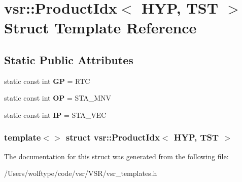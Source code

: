 \hypertarget{structvsr_1_1_product_idx_3_01_h_y_p_00_01_t_s_t_01_4}{\section{vsr\-:\-:Product\-Idx$<$ H\-Y\-P, T\-S\-T $>$ Struct Template Reference}
\label{structvsr_1_1_product_idx_3_01_h_y_p_00_01_t_s_t_01_4}
}
\subsection*{Static Public Attributes}
\begin{DoxyCompactItemize}
\item 
\hypertarget{structvsr_1_1_product_idx_3_01_h_y_p_00_01_t_s_t_01_4_a28641cdfaa7eb15dbb7767e15762afa7}{static const int {\bfseries G\-P} = R\-T\-C}\label{structvsr_1_1_product_idx_3_01_h_y_p_00_01_t_s_t_01_4_a28641cdfaa7eb15dbb7767e15762afa7}

\item 
\hypertarget{structvsr_1_1_product_idx_3_01_h_y_p_00_01_t_s_t_01_4_a94449d85c2a24c7a1dac92325568e8f6}{static const int {\bfseries O\-P} = S\-T\-A\-\_\-\-M\-N\-V}\label{structvsr_1_1_product_idx_3_01_h_y_p_00_01_t_s_t_01_4_a94449d85c2a24c7a1dac92325568e8f6}

\item 
\hypertarget{structvsr_1_1_product_idx_3_01_h_y_p_00_01_t_s_t_01_4_a3c419cc2c36a202a65904bc6fbaaf5d2}{static const int {\bfseries I\-P} = S\-T\-A\-\_\-\-V\-E\-C}\label{structvsr_1_1_product_idx_3_01_h_y_p_00_01_t_s_t_01_4_a3c419cc2c36a202a65904bc6fbaaf5d2}

\end{DoxyCompactItemize}
\subsubsection*{template$<$$>$ struct vsr\-::\-Product\-Idx$<$ H\-Y\-P, T\-S\-T $>$}



The documentation for this struct was generated from the following file\-:\begin{DoxyCompactItemize}
\item 
/\-Users/wolftype/code/vsr/\-V\-S\-R/vsr\-\_\-templates.\-h\end{DoxyCompactItemize}
